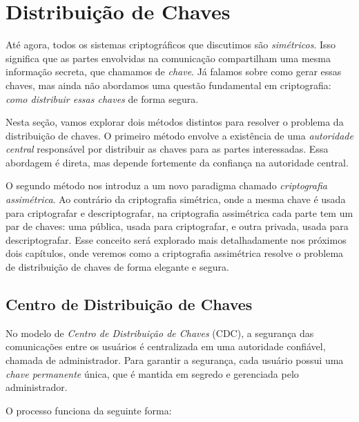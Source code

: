 \chapter{Distribuição de Chaves}
\label{cha:distribuicao-chaves}

Até agora, todos os sistemas criptográficos que discutimos são {\em simétricos}.
Isso significa que as partes envolvidas na comunicação compartilham uma mesma informação secreta, que chamamos de {\em chave}.
Já falamos sobre como gerar essas chaves, mas ainda não abordamos uma questão fundamental em criptografia:
{\em como distribuir essas chaves} de forma segura.

Nesta seção, vamos explorar dois métodos distintos para resolver o problema da distribuição de chaves.
O primeiro método envolve a existência de uma {\em autoridade central} responsável por distribuir as chaves para as partes interessadas.
Essa abordagem é direta, mas depende fortemente da confiança na autoridade central.

O segundo método nos introduz a um novo paradigma chamado {\em criptografia assimétrica}.
Ao contrário da criptografia simétrica, onde a mesma chave é usada para criptografar e descriptografar, na criptografia assimétrica cada parte tem um par de chaves:
uma pública, usada para criptografar, e outra privada, usada para descriptografar.
Esse conceito será explorado mais detalhadamente nos próximos dois capítulos, onde veremos como a criptografia assimétrica resolve o problema de distribuição de chaves de forma elegante e segura.

\section{Centro de Distribuição de Chaves}
\label{sec:kdc}

No modelo de {\em Centro de Distribuição de Chaves} (CDC), a segurança das comunicações entre os usuários é centralizada em uma autoridade confiável, chamada de administrador.
Para garantir a segurança, cada usuário possui uma {\em chave permanente} única, que é mantida em segredo e gerenciada pelo administrador.

O processo funciona da seguinte forma:


